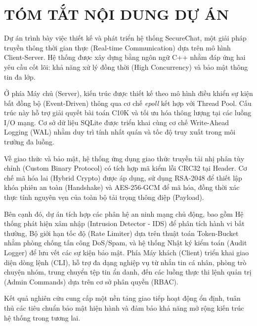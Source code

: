 \chapter*{TÓM TẮT NỘI DUNG DỰ ÁN}

Dự án trình bày việc thiết kế và phát triển hệ thống SecureChat, một giải pháp truyền thông thời gian thực (Real-time Communication) dựa trên mô hình Client-Server. Hệ thống được xây dựng bằng ngôn ngữ C++ nhằm đáp ứng hai yêu cầu cốt lõi: khả năng xử lý đồng thời (High Concurrency) và bảo mật thông tin đa lớp.

Ở phía Máy chủ (Server), kiến trúc được thiết kế theo mô hình điều khiển sự kiện bất đồng bộ (Event-Driven) thông qua cơ chế \textit{epoll} kết hợp với Thread Pool. Cấu trúc này hỗ trợ giải quyết bài toán C10K và tối ưu hóa thông lượng tại các luồng I/O mạng. Cơ sở dữ liệu SQLite được triển khai cùng cơ chế Write-Ahead Logging (WAL) nhằm duy trì tính nhất quán và tốc độ truy xuất trong môi trường đa luồng.

Về giao thức và bảo mật, hệ thống ứng dụng giao thức truyền tải nhị phân tùy chỉnh (Custom Binary Protocol) có tích hợp mã kiểm lỗi CRC32 tại Header. Cơ chế mã hóa lai (Hybrid Crypto) được áp dụng, sử dụng RSA-2048 để thiết lập khóa phiên an toàn (Handshake) và AES-256-GCM để mã hóa, đồng thời xác thực tính nguyên vẹn của toàn bộ tải trọng thông điệp (Payload).

Bên cạnh đó, dự án tích hợp các phân hệ an ninh mạng chủ động, bao gồm Hệ thống phát hiện xâm nhập (Intrusion Detector - IDS) để phân tích hành vi bất thường, Bộ giới hạn tốc độ (Rate Limiter) dựa trên thuật toán Token-Bucket nhằm phòng chống tấn công DoS/Spam, và hệ thống Nhật ký kiểm toán (Audit Logger) để lưu vết các sự kiện bảo mật. Phía Máy khách (Client) triển khai giao diện dòng lệnh (CLI), hỗ trợ đa dạng nghiệp vụ từ nhắn tin cá nhân, phòng trò chuyện nhóm, trung chuyển tệp tin ẩn danh, đến các luồng thực thi lệnh quản trị (Admin Commands) dựa trên cơ sở phân quyền (RBAC).

Kết quả nghiên cứu cung cấp một nền tảng giao tiếp hoạt động ổn định, tuân thủ các tiêu chuẩn bảo mật hiện hành và đảm bảo khả năng mở rộng kiến trúc hệ thống trong tương lai.
